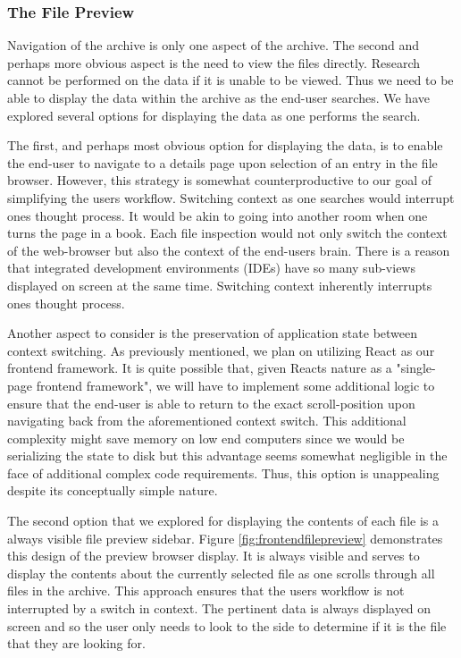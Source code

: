 \documentclass[12pt]{article}
\begin{document}
\subsubsection{The File Preview}

Navigation of the archive is only one aspect of the archive. The second and perhaps more obvious aspect is the need to view the files directly. Research cannot be performed on the data if it is unable to be viewed. Thus we need to be able to display the data within the archive as the end-user searches. We have explored several options for displaying the data as one performs the search.

The first, and perhaps most obvious option for displaying the data, is to enable the end-user to navigate to a details page upon selection of an entry in the file browser. However, this strategy is somewhat counterproductive to our goal of simplifying the users workflow. Switching context as one searches would interrupt ones thought process. It would be akin to going into another room when one turns the page in a book. Each file inspection would not only switch the context of the web-browser but also the context of the end-users brain. There is a reason that integrated development environments (IDEs) have so many sub-views displayed on screen at the same time. Switching context inherently interrupts ones thought process. 

Another aspect to consider is the preservation of application state between context switching. As previously mentioned, we plan on utilizing React as our frontend framework. It is quite possible that, given Reacts nature as a "single-page frontend framework", we will have to implement some additional logic to ensure that the end-user is able to return to the exact scroll-position upon navigating back from the aforementioned context switch. This additional complexity might save memory on low end computers since we would be serializing the state to disk but this advantage seems somewhat negligible in the face of additional complex code requirements. Thus, this option is unappealing despite its conceptually simple nature.

The second option that we explored for displaying the contents of each file is a always visible file preview sidebar. Figure \ref{fig:frontendfilepreview} demonstrates this design of the preview browser display. It is always visible and serves to display the contents about the currently selected file as one scrolls through all files in the archive. This approach ensures that the users workflow is not interrupted by a switch in context. The pertinent data is always displayed on screen and so the user only needs to look to the side to determine if it is the file that they are looking for.
\end{document}
